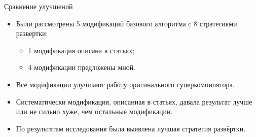 \documentclass[xcolor=table]{beamer}
\begin{document}
%
\begin{frame}{Сравнение улучшений}

\begin{itemize}
\item Были рассмотрены 5 модификаций базового алгоритма
      c 8 стратегиями развертки:
      \begin{itemize}
      \item 1 модификация описана в статьях;
      \item 4 модификации предложены мной.
      \end{itemize}
\item Все модификации улучшают работу оригинального суперкомпилятора.
\item Систематически модификация, описанная в статьях, давала
      результат лучше или не сильно хуже, чем остальные модификации.
\item По результатам исследования была выявлена
      лучшая стратегия развёртки.
\end{itemize}

\end{frame}
%
\end{document}
